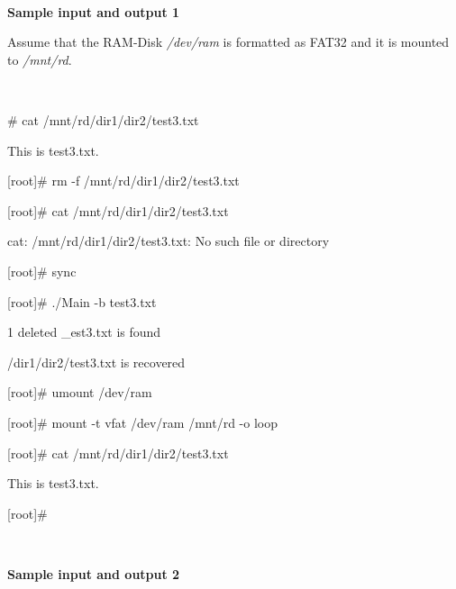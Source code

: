 \documentclass[a4paper,12pt]{article}
\begin{document}
~

\noindent \textbf{Sample input and output 1}

Assume that the RAM-Disk \textit{/dev/ram} is formatted as FAT32 and it is mounted to \textit{/mnt/rd}.

~

\begin{tt}
[root]\# cat /mnt/rd/dir1/dir2/test3.txt

This is test3.txt.

[root]\# rm -f /mnt/rd/dir1/dir2/test3.txt

[root]\# cat /mnt/rd/dir1/dir2/test3.txt

cat: /mnt/rd/dir1/dir2/test3.txt: No such file or directory

[root]\# sync

[root]\# ./Main -b test3.txt

1 deleted \_est3.txt is found

/dir1/dir2/test3.txt is recovered

[root]\# umount /dev/ram

[root]\# mount -t vfat /dev/ram /mnt/rd -o loop

[root]\# cat /mnt/rd/dir1/dir2/test3.txt

This is test3.txt.

[root]\#

\end{tt}

~

\noindent \textbf{Sample input and output 2}
\end{document}
